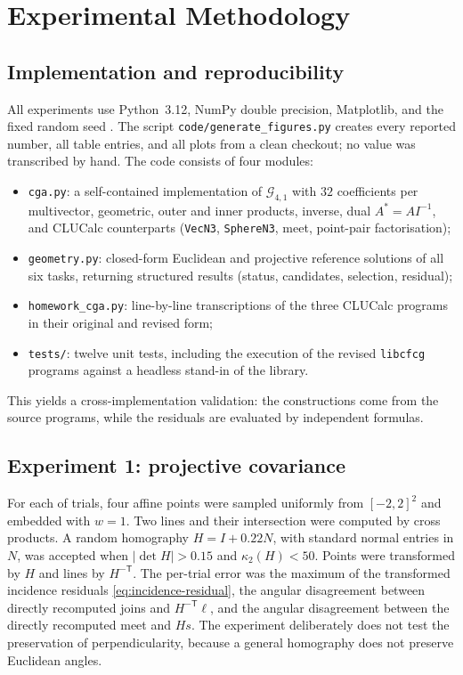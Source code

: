 \documentclass[11pt,a4paper]{article}
\theoremstyle{plain}
\theoremstyle{definition}
\theoremstyle{remark}
\newcommand{\GA}{\mathcal{G}_{4,1}}
\newcommand{\T}{\mathsf{T}}
\newcommand{\abs}[1]{\left\lvert#1\right\rvert}
\begin{document}
\section{Experimental Methodology}\label{sec:experiments}

\subsection{Implementation and reproducibility}

All experiments use Python~3.12, NumPy double precision, Matplotlib, and the
fixed random seed \ExperimentSeed. The script \texttt{code/generate\_figures.py}
creates every reported number, all table entries, and all plots from a clean
checkout; no value was transcribed by hand. The code consists of four modules:
\begin{itemize}
  \item \texttt{cga.py}: a self-contained implementation of $\GA$ with $32$
        coefficients per multivector, geometric, outer and inner products,
        inverse, dual $A^*=AI^{-1}$, and CLUCalc counterparts
        (\texttt{VecN3}, \texttt{SphereN3}, meet, point-pair factorisation);
  \item \texttt{geometry.py}: closed-form Euclidean and projective reference
        solutions of all six tasks, returning structured results
        (status, candidates, selection, residual);
  \item \texttt{homework\_cga.py}: line-by-line transcriptions of the three
        CLUCalc programs in their original and revised form;
  \item \texttt{tests/}: twelve unit tests, including the execution of the
        revised \texttt{libcfcg} programs against a headless stand-in of the
        library.
\end{itemize}
This yields a cross-implementation validation: the constructions come from the
source programs, while the residuals are evaluated by independent formulas.

\subsection{Experiment 1: projective covariance}

For each of \ProjectiveTrials{} trials, four affine points were sampled
uniformly from $[-2,2]^2$ and embedded with $w=1$. Two lines and their
intersection were computed by cross products. A random homography $H=I+0.22N$,
with standard normal entries in $N$, was accepted when $\abs{\det H}>0.15$ and
$\kappa_2(H)<50$. Points were transformed by $H$ and lines by $H^{-\T}$. The
per-trial error was the maximum of the transformed incidence residuals
\cref{eq:incidence-residual}, the angular disagreement between directly
recomputed joins and $H^{-\T}\ell$, and the angular disagreement between the
directly recomputed meet and $Hs$. The experiment deliberately does not test
the preservation of perpendicularity, because a general homography does not
preserve Euclidean angles.
\end{document}
